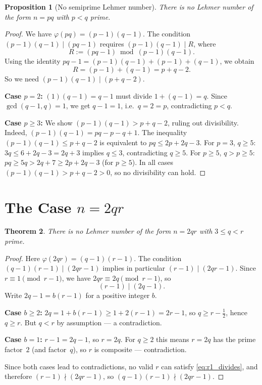 \documentclass[12pt,a4paper]{amsart}
\newtheorem{theorem}{Theorem}[section]
\newtheorem{proposition}[theorem]{Proposition}
\theoremstyle{definition}
\newcommand{\euler}{\varphi}
\begin{document}
\begin{proposition}[No semiprime Lehmer number]
\label{prop:semiprime}
There is no Lehmer number of the form $n = pq$ with $p < q$ prime.
\end{proposition}

\begin{proof}
We have $\euler(pq) = (p-1)(q-1)$.  The condition $(p-1)(q-1) \mid (pq-1)$
requires $(p-1)(q-1) \mid R$, where
\[
  R := (pq - 1) \bmod (p-1)(q-1).
\]
Using the identity $pq - 1 = (p-1)(q-1) + (p-1) + (q-1)$, we obtain
\[
  R = (p - 1) + (q - 1) = p + q - 2.
\]
So we need $(p-1)(q-1) \mid (p + q - 2)$.

\textbf{Case $p = 2$:} $(1)(q-1) = q - 1$ must divide $1 + (q-1) = q$.
Since $\gcd(q-1, q) = 1$, we get $q - 1 = 1$, i.e.\ $q = 2 = p$, contradicting
$p < q$.

\textbf{Case $p \ge 3$:} We show $(p-1)(q-1) > p+q-2$, ruling out divisibility.
Indeed, $(p-1)(q-1) = pq - p - q + 1$.  The inequality $(p-1)(q-1) \le p+q-2$
is equivalent to $pq \le 2p + 2q - 3$.  For $p = 3$, $q \ge 5$:
$3q \le 6 + 2q - 3 = 2q + 3$ implies $q \le 3$, contradicting $q \ge 5$.
For $p \ge 5$, $q > p \ge 5$: $pq \ge 5q > 2q + 7 \ge 2p + 2q - 3$ (for $p \ge 5$).
In all cases $(p-1)(q-1) > p+q-2 > 0$, so no divisibility can hold.
\end{proof}

\section{The Case \texorpdfstring{$n = 2qr$}{n = 2qr}}
\label{sec:2qr}

\begin{theorem}
\label{thm:2qr}
There is no Lehmer number of the form $n = 2qr$ with $3 \le q < r$ prime.
\end{theorem}

\begin{proof}
Here $\euler(2qr) = (q-1)(r-1)$.  The condition $(q-1)(r-1) \mid (2qr - 1)$
implies in particular $(r-1) \mid (2qr - 1)$.  Since $r \equiv 1 \pmod{r-1}$,
we have $2qr \equiv 2q \pmod{r-1}$, so
\begin{equation}
  (r - 1) \mid (2q - 1).
  \label{eq:r1_divides}
\end{equation}
Write $2q - 1 = b(r-1)$ for a positive integer $b$.

\medskip
\noindent\textbf{Case $b \ge 2$:}
$2q = 1 + b(r-1) \ge 1 + 2(r-1) = 2r - 1$, so $q \ge r - \tfrac{1}{2}$,
hence $q \ge r$.  But $q < r$ by assumption — a contradiction.

\medskip
\noindent\textbf{Case $b = 1$:}
$r - 1 = 2q - 1$, so $r = 2q$.  For $q \ge 2$ this means $r = 2q$ has the
prime factor~$2$ (and factor~$q$), so $r$ is composite — contradiction.

\medskip
Since both cases lead to contradictions, no valid $r$ can satisfy
\eqref{eq:r1_divides}, and therefore $(r-1) \nmid (2qr - 1)$, so
$(q-1)(r-1) \nmid (2qr-1)$.
\end{proof}
\end{document}
